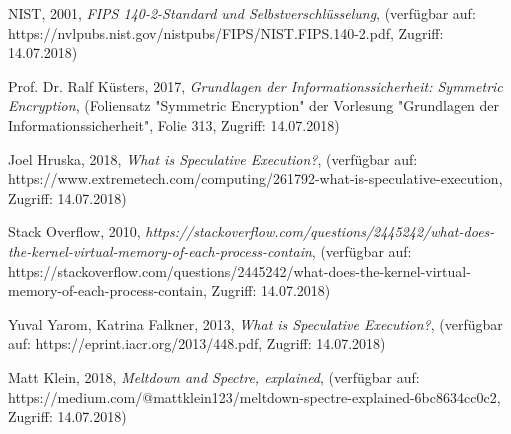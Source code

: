 \documentclass[conference,10pt,a4paper,twocolumn]{IEEEtran}
\begin{document}
\begin{thebibliography}{1}
NIST, 2001, \emph{FIPS 140-2-Standard und Selbstverschlüsselung}, (verfügbar auf: https://nvlpubs.nist.gov/nistpubs/FIPS/NIST.FIPS.140-2.pdf, Zugriff: 14.07.2018)

Prof. Dr. Ralf Küsters, 2017, \emph{Grundlagen der Informationssicherheit: Symmetric Encryption}, (Foliensatz "Symmetric Encryption" der Vorlesung "Grundlagen der Informationssicherheit", Folie 313, Zugriff: 14.07.2018)

Joel Hruska, 2018, \emph{What is Speculative Execution?}, (verfügbar auf: https://www.extremetech.com/computing/261792-what-is-speculative-execution, Zugriff: 14.07.2018)

Stack Overflow, 2010, \emph{https://stackoverflow.com/questions/2445242/what-does-the-kernel-virtual-memory-of-each-process-contain}, (verfügbar auf: https://stackoverflow.com/questions/2445242/what-does-the-kernel-virtual-memory-of-each-process-contain, Zugriff: 14.07.2018)

Yuval Yarom, Katrina Falkner, 2013, \emph{What is Speculative Execution?}, (verfügbar auf: https://eprint.iacr.org/2013/448.pdf, Zugriff: 14.07.2018)

Matt Klein, 2018, \emph{Meltdown and Spectre, explained}, (verfügbar auf: https://medium.com/@mattklein123/meltdown-spectre-explained-6bc8634cc0c2, Zugriff: 14.07.2018)

\end{thebibliography}

\end{document}
